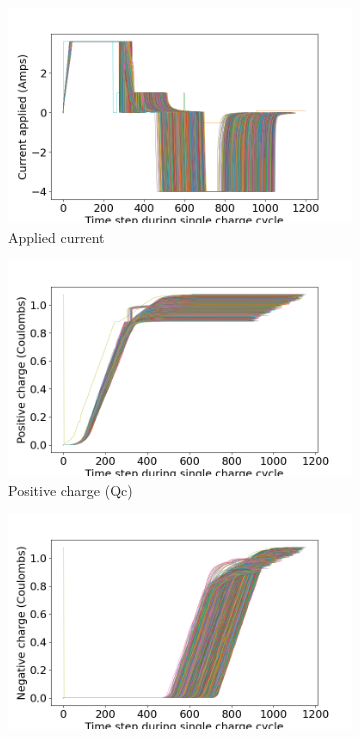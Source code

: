 \begin{itemize}
            \begin{figure}[H]
            \centering
            \begin{subfigure}[b]{0.32\linewidth}
                \includegraphics[width=\linewidth]{figs/b1c0_iapp_intracycle.png}
                \caption{Applied current}
            \end{subfigure}
            \begin{subfigure}[b]{0.32\linewidth}
                \includegraphics[width=\linewidth]{figs/b1c0_qc_intracycle.png}
                \caption{Positive charge (Qc)}
            \end{subfigure}
            \begin{subfigure}[b]{0.32\linewidth}
                \includegraphics[width=\linewidth]{figs/b1c0_qd_intracycle.png}

\end{subfigure}
\end{figure}
\end{itemize}
